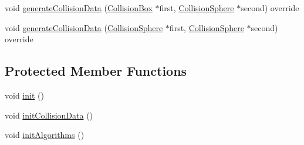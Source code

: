 \begin{DoxyCompactItemize}
\item 
void \mbox{\hyperlink{classrum_1_1_narrow_phase_filter_abc6c56571ea9110801cac4b57960b8b3}{generate\+Collision\+Data}} (\mbox{\hyperlink{classrum_1_1_collision_box}{Collision\+Box}} $\ast$first, \mbox{\hyperlink{classrum_1_1_collision_sphere}{Collision\+Sphere}} $\ast$second) override
\item 
void \mbox{\hyperlink{classrum_1_1_narrow_phase_filter_a5cc42b7f9ce3866d5e837d95fe3f1592}{generate\+Collision\+Data}} (\mbox{\hyperlink{classrum_1_1_collision_sphere}{Collision\+Sphere}} $\ast$first, \mbox{\hyperlink{classrum_1_1_collision_sphere}{Collision\+Sphere}} $\ast$second) override
\end{DoxyCompactItemize}
\subsection*{Protected Member Functions}
\begin{DoxyCompactItemize}
\item 
void \mbox{\hyperlink{classrum_1_1_narrow_phase_filter_aae77f4be01dc6b6b4189ee266d8ca55a}{init}} ()
\item 
void \mbox{\hyperlink{classrum_1_1_narrow_phase_filter_afde3247e3cea00a46f8bf360951930d0}{init\+Collision\+Data}} ()
\item 
void \mbox{\hyperlink{classrum_1_1_narrow_phase_filter_a60ad337a7ee592f8cce5f18eec9eca37}{init\+Algorithms}} ()
\end{DoxyCompactItemize}
